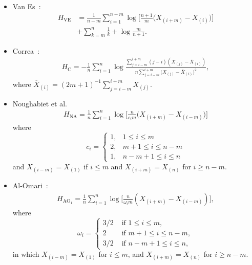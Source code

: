 \documentclass[journal]{IEEEtran}
\begin{document}
\begin{itemize}
	\item Van Es~\cite{VanEs92}:
	\begin{align}
		\label{HVE}
		H_\text{VE}&=\frac{1}{n-m} \sum_{i=1}^{n-m}\log{\Big[\frac{n+1}{m}\big(X_{(i+m)}-X_{(i)}\big)\Big]} \nonumber\\
		&+\sum_{k=m}^{n} \frac{1}{k}+\log \frac{m}{n+1}.
	\end{align}
	\item Correa~\cite{Correa95}:
	\begin{align}
		\label{HC}
		H_\text{C}=-\frac{1}{n} \sum_{i=1}^{n} \log \frac{\sum_{j=i-m}^{i+m}(j-i)\left(X_{(j)}-\overline{X}_{(i)}\right)}{n \sum_{j=i-m}^{i+m}\big(X_{(j)}-\overline{X}_{(i)}\big)^{2}},
	\end{align}
	where $\overline{X}_{(i)}=(2 m+1)^{-1} \sum_{j=i-m}^{i+m} X_{(j)}$.
	\item Noughabiet et al.~\cite{Noughabi2010} 
	\label{HNA}
	\begin{align}
		H_\text{NA}=\frac{1}{n} \sum_{i=1}^{n} \log \Big[\frac{n}{c_{i} m}\big(X_{(i+m)}-X_{(i-m)}\big)\Big]
	\end{align}
	where 
	\begin{equation*}
		c_{i}=\left\{\begin{array}{ll}
			1, & 1 \leq i \leq m \\
			2, & m+1 \leq i \leq n-m \\
			1, & n-m+1 \leq i \leq n
		\end{array}\right.
	\end{equation*}
	and $X_{(i-m)}=X_{(1)}$ if $i \leq m$ and $X_{(i+m)}=X_{(n)}$ for $i \geq n-m .$ 
	\item Al-Omari~\cite{AlOmari2014}:
	\begin{align}
		H_{{\text{AO}}_1}=\frac{1}{n} \sum_{i=1}^{n} \log \Big[\frac{n}{\omega_{i} m}\left(X_{(i+m)}-X_{(i-m)}\right)\Big], 
		\label{AHE}
	\end{align}
	where
	\begin{equation*}
		\omega_{i}= \begin{cases}
			3/2 & \text{ if }1 \leq i \leq m, \\
			2 & \text{ if } m+1 \leq i \leq n-m, \\
			3/2 & \text{ if } n-m+1 \leq i \leq n,
		\end{cases}
	\end{equation*}
	in which $X_{(i-m)}=X_{(1)}$ for $i \leq m$, and $X_{(i+m)}=X_{(n)}$ for $i \geq n-m$. 
	

\end{itemize}
\end{document}
